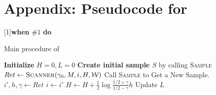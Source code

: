 \section{Appendix: Pseudocode for \Sparrow}\label{appendix:pseudocode}

[1]{\textbf{when} \(\mbox{#1}\) \textbf{do}}{}%

\begin{algorithm}[H]
\caption{Main procedure of \Sparrow}\label{algorithm}

\begin{algorithmic}[0]

\State \textbf{Initialize} $H=0, L=0$
\State \textbf{Create initial sample $S$} by calling \textsc{Sample}
  \State $Ret \gets \Call{Scanner}{\gamma_0, M, i, H, \weakRules}$
  \State Call \textsc{Sample} to Get a New Sample.
  \Else
  \State $i',h,\gamma \gets Ret$
  \State $i \gets i'$
  \State $H \gets H + \frac{1}{2} \log \frac{1/2+\gamma}{1/2-\gamma} h$
  \State Update $L$
  \EndIf
\EndFor

\end{algorithmic}

\end{algorithm}



